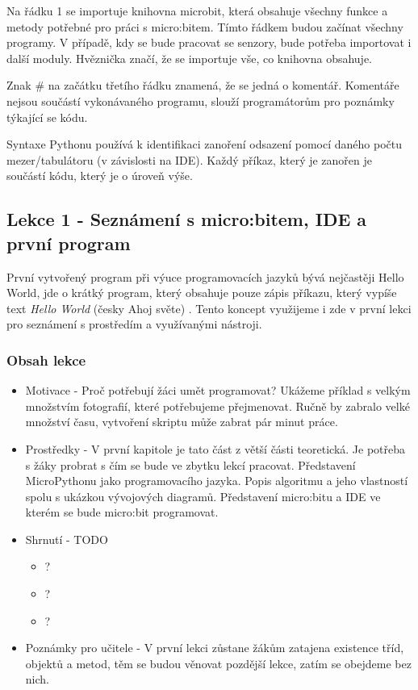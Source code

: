 \documentclass[
  digital,     %
  oneside,     %
  nosansbold,  %
  colorbold, %
  lof,         %
  nolot,         %
]{fithesis4}
\begin{document}
Na řádku 1 se importuje knihovna microbit, která obsahuje všechny funkce a metody potřebné pro práci s micro:bitem. Tímto řádkem budou začínat všechny programy. V případě, kdy se bude pracovat se senzory, bude potřeba importovat i další moduly. Hvěznička značí, že se importuje vše, co knihovna obsahuje.

Znak \# na začátku třetího řádku znamená, že se jedná o komentář. Komentáře nejsou součástí vykonávaného programu, slouží programátorům pro poznámky týkající se kódu.

Syntaxe Pythonu používá k identifikaci zanoření odsazení pomocí daného počtu mezer/tabulátoru (v závislosti na IDE). Každý příkaz, který je zanořen je součástí kódu, který je o úroveň výše.

\subsection{Lekce 1 - Seznámení s micro:bitem, IDE a první program}
První vytvořený program při výuce programovacích jazyků bývá nejčastěji Hello World, jde o krátký program, který obsahuje pouze zápis příkazu, který vypíše text \textit{Hello World} (česky Ahoj světe) \cite{helloWorld}. Tento koncept využijeme i zde v první lekci pro seznámení s prostředím a využívanými nástroji.
\subsubsection{Obsah lekce}
\begin{itemize}
    \item Motivace - Proč potřebují žáci umět programovat? Ukážeme příklad s velkým množstvím fotografií, které potřebujeme přejmenovat. Ručně by zabralo velké množství času, vytvoření skriptu může zabrat pár minut práce.
    \item Prostředky - V první kapitole je tato část z větší části teoretická. Je potřeba s žáky probrat s čím se bude ve zbytku lekcí pracovat. Představení MicroPythonu jako programovacího jazyka. Popis algoritmu a jeho vlastností spolu s ukázkou vývojových diagramů. Představení micro:bitu a IDE ve kterém se bude micro:bit programovat. 
    \item Shrnutí - TODO
    \begin{itemize}
        \item ?
        \item ?
        \item ?
    \end{itemize}
    \item Poznámky pro učitele - V první lekci zůstane žákům zatajena existence tříd, objektů a metod, těm se budou věnovat pozdější lekce, zatím se obejdeme bez nich.
\end{itemize}
\end{document}
